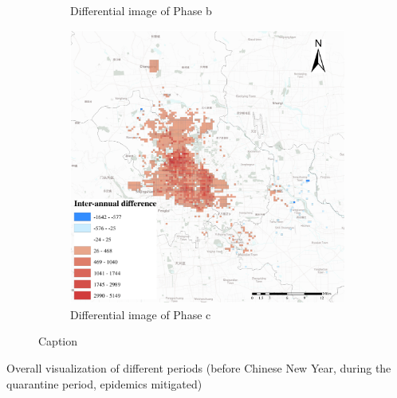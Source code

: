 \documentclass[preprints,ijgi,submit,moreauthors]{Definitions/mdpi}
\begin{document}
\begin{figure}[H]
\begin{subfigure}{.3\textwidth}
        \caption{Differential image of Phase b}
    \end{subfigure}
        \begin{subfigure}{.3\textwidth}
        \includegraphics[width=\textwidth]{Figures/BSSMinusmp3.eps}
        \caption{Differential image of Phase c}
    \end{subfigure}
    \caption{Caption}
    \label{fig:compare_2019_and_2020}
\end{figure}

Overall visualization of different periods (before Chinese New Year, during the quarantine period, epidemics mitigated)
\end{document}
